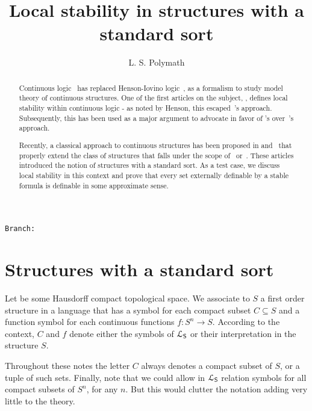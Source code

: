 \documentclass{amsproc}
\author{L. S. Polymath}
\theoremstyle{mio}
\renewcommand*{\emph}[1]{%
   \smash{\tikz[baseline]\node[rectangle, fill=teal!25, rounded corners, inner xsep=0.5ex, inner ysep=0.2ex, anchor=base, minimum height = 2.7ex]{\strut #1};}}
\newcommand\branch{}
\begin{document}
\title{Local stability in structures with a standard sort}
\hfill\texttt{Branch:\ \branch\ \DTMnow}
\maketitle
\raggedbottom

\begin{abstract}
  Continuous logic~\cite{BBHU} has replaced Henson-Iovino logic~\cite{HI}, as a
  formalism to study model theory of continuous structures.
  One of the first articles on the subject, \cite{BU}, defines local stability within continuous logic - as noted by Henson, this escaped~\cite{HI}'s approach.
  Subsequently, this has been used as a major argument to advocate in favor of \cite{BBHU}'s over~\cite{HI}'s approach.\smallskip

  \noindent Recently, a classical approach to continuous structures has been proposed  in \cite{clcl} and~\cite{Z} that properly extend the class of structures that
  falls under the scope of~\cite{HI} or~\cite{BBHU}.
  These articles introduced the notion of structures with a standard sort. As a test case, we discuss local stability in this context and prove that every set externally definable by a stable formula is definable in some approximate sense.
\end{abstract}

\def\medrel#1{\parbox{6ex}{\hfil $#1$}}
\def\ceq#1#2#3{\parbox[t]{13ex}{$\displaystyle #1$}\medrel{#2}{$\displaystyle #3$}}

\section{Structures with a standard sort}


Let \emph{$S$\/} be some Hausdorff compact topological space.
We associate to $S$ a first order structure in a language \emph{${\EuScript L}_{\sf S}$\/} that has a symbol for each compact subset $C\subseteq S$ and a function symbol for each continuous functions $f:S^n\to S$.
According to the context, $C$ and $f$ denote either the symbols of ${\EuScript L}_{\sf S}$ or their interpretation in the structure $S$.

Throughout these notes the letter $C$ always denotes a compact subset of $S$, or a tuple of such sets.
Finally, note that we could allow in ${\EuScript L}_{\sf S}$ relation symbols for all compact subsets of $S^n$, for any $n$.
But this would clutter the notation adding very little to the theory.
\end{document}
